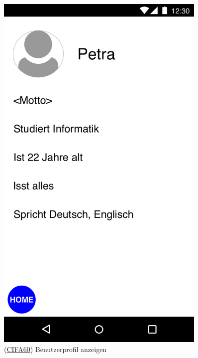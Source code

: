 \documentclass[a4paper]{scrreprt}
\begin{document}
\begin{figure}[H]
	\centering 
	\begin{minipage}[b]{0.48\textwidth} 
		\centering 
		\includegraphics[width=0.9\textwidth]{res/GUI/05.jpeg} 
		\label{Fig.5}
		(\hyperlink{cifa60}{CIFA60}) Benutzerprofil anzeigen
	\end{minipage}
	\begin{minipage}[b]{0.48\textwidth} 
		\centering 

\end{minipage}
\end{figure}
\end{document}
